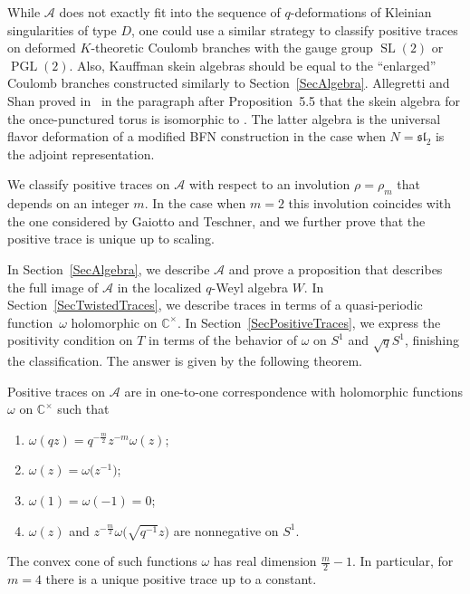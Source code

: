 \documentclass[pdftex]{sigma}
\newcommand\CC{\mathbb{C}}
\DeclareMathOperator\SL{SL}
\newcommand{\mc}{\mathcal}
\newcommand{\PGL}{\operatorname{PGL}}
\numberwithin{equation}{section}
\theoremstyle{definition}
\begin{document}
While $\mc{A}$ does not exactly fit into the sequence of $q$-deformations of Kleinian singularities of type $D$, one could use a similar strategy to classify positive traces on deformed $K$-theoretic Coulomb branches with the gauge group $\SL(2)$ or $\PGL(2)$. Also, Kauffman skein algebras should be equal to the ``enlarged'' Coulomb branches constructed similarly to Section~\ref{SecAlgebra}. Allegretti and Shan proved in~\cite{AS} in the paragraph after Proposition~5.5 that the skein algebra for the once-punctured torus is isomorphic to \smash{$K^{\SL(2,\CC[t]\times \CC[t]^{\times})\rtimes \CC_q^{\times}}(\mc{R}_{\PGL(2),\mathfrak{sl}_2})$}. The latter algebra is the universal flavor deformation of a modified BFN construction in the case when $N=\mathfrak{sl}_2$ is the adjoint representation.

We classify positive traces on $\mc{A}$ with respect to an involution $\rho=\rho_m$ that depends on an integer $m$. In the case when $m=2$ this involution coincides with the one considered by Gaiotto and Teschner, and we further prove that the positive trace is unique up to scaling.

In Section~\ref{SecAlgebra}, we describe $\mc{A}$ and prove a proposition that describes the full image of $\mc{A}$ in the localized $q$-Weyl algebra $W$. In Section~\ref{SecTwistedTraces}, we describe traces in terms of a quasi-periodic function~$\omega$ holomorphic on $\CC^{\times}$. In Section~\ref{SecPositiveTraces}, we express the positivity condition on $T$ in terms of the behavior of $\omega$ on $S^1$ and $\sqrt{q}S^1$, finishing the classification. The answer is given by the following theorem.

\begin{theorem*}
 Positive traces on $\mc{A}$ are in one-to-one correspondence with holomorphic functions $\omega$ on $\CC^{\times}$ such that
 \begin{enumerate}\itemsep=0pt
 \item[$(1)$] $\omega(qz)=q^{-\frac{m}{2}}z^{-m}\omega(z)$;
 \item[$(2)$] $\omega(z)=\omega\bigl(z^{-1}\bigr)$;
 \item[$(3)$] $\omega(1)=\omega(-1)=0$;
 \item[$(4)$] $\omega(z)$ and $z^{-\frac{m}{2}}\omega\bigl(\sqrt{q^{-1}}z\bigr)$ are nonnegative on $S^1$.
 \end{enumerate}

 The convex cone of such functions $\omega$ has real dimension $\frac{m}{2}-1$. In particular, for $m=4$ there is a unique positive trace up to a constant.
 \end{theorem*}
\end{document}
